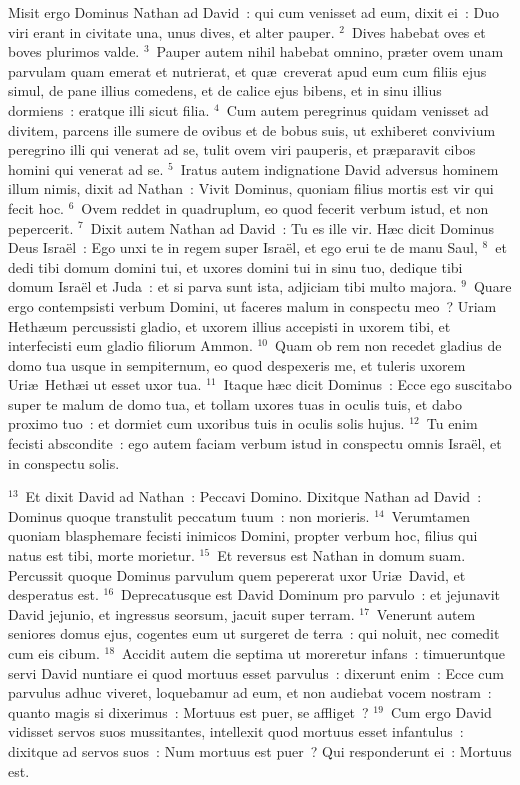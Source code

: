 \lettrine[lines=3,image=true,loversize=0.05,lraise=-0.03]{M}{}isit ergo Dominus Nathan ad David~: qui cum venisset ad eum, dixit ei~: Duo viri erant in civitate una, unus dives, et alter pauper.
${}^{2}$~Dives habebat oves et boves plurimos valde.
${}^{3}$~Pauper autem nihil habebat omnino, pr\ae ter ovem unam parvulam quam emerat et nutrierat, et qu\ae\ creverat apud eum cum filiis ejus simul, de pane illius comedens, et de calice ejus bibens, et in sinu illius dormiens~: eratque illi sicut filia.
${}^{4}$~Cum autem peregrinus quidam venisset ad divitem, parcens ille sumere de ovibus et de bobus suis, ut exhiberet convivium peregrino illi qui venerat ad se, tulit ovem viri pauperis, et pr\ae paravit cibos homini qui venerat ad se.
${}^{5}$~Iratus autem indignatione David adversus hominem illum nimis, dixit ad Nathan~: Vivit Dominus, quoniam filius mortis est vir qui fecit hoc.
${}^{6}$~Ovem reddet in quadruplum, eo quod fecerit verbum istud, et non pepercerit.
${}^{7}$~Dixit autem Nathan ad David~: Tu es ille vir. H\ae c dicit Dominus Deus Isra\"el~: Ego unxi te in regem super Isra\"el, et ego erui te de manu Saul,
${}^{8}$~et dedi tibi domum domini tui, et uxores domini tui in sinu tuo, dedique tibi domum Isra\"el et Juda~: et si parva sunt ista, adjiciam tibi multo majora.
${}^{9}$~Quare ergo contempsisti verbum Domini, ut faceres malum in conspectu meo~? Uriam Heth\ae um percussisti gladio, et uxorem illius accepisti in uxorem tibi, et interfecisti eum gladio filiorum Ammon.
${}^{10}$~Quam ob rem non recedet gladius de domo tua usque in sempiternum, eo quod despexeris me, et tuleris uxorem Uri\ae\ Heth\ae i ut esset uxor tua.
${}^{11}$~Itaque h\ae c dicit Dominus~: Ecce ego suscitabo super te malum de domo tua, et tollam uxores tuas in oculis tuis, et dabo proximo tuo~: et dormiet cum uxoribus tuis in oculis solis hujus.
${}^{12}$~Tu enim fecisti abscondite~: ego autem faciam verbum istud in conspectu omnis Isra\"el, et in conspectu solis.


${}^{13}$~Et dixit David ad Nathan~: Peccavi Domino. Dixitque Nathan ad David~: Dominus quoque transtulit peccatum tuum~: non morieris.
${}^{14}$~Verumtamen quoniam blasphemare fecisti inimicos Domini, propter verbum hoc, filius qui natus est tibi, morte morietur.
${}^{15}$~Et reversus est Nathan in domum suam. Percussit quoque Dominus parvulum quem pepererat uxor Uri\ae\ David, et desperatus est.
${}^{16}$~Deprecatusque est David Dominum pro parvulo~: et jejunavit David jejunio, et ingressus seorsum, jacuit super terram.
${}^{17}$~Venerunt autem seniores domus ejus, cogentes eum ut surgeret de terra~: qui noluit, nec comedit cum eis cibum.
${}^{18}$~Accidit autem die septima ut moreretur infans~: timueruntque servi David nuntiare ei quod mortuus esset parvulus~: dixerunt enim~: Ecce cum parvulus adhuc viveret, loquebamur ad eum, et non audiebat vocem nostram~: quanto magis si dixerimus~: Mortuus est puer, se affliget~?
${}^{19}$~Cum ergo David vidisset servos suos mussitantes, intellexit quod mortuus esset infantulus~: dixitque ad servos suos~: Num mortuus est puer~? Qui responderunt ei~: Mortuus est.


